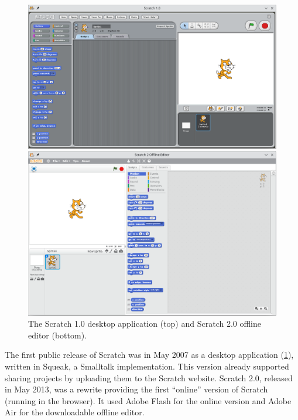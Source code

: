 \documentclass[../main]{subfiles}
\begin{document}
\begin{figure}
    \begin{wide}
        \includegraphics[width=\linewidth]{scratch-1}

        \vspace{0.5em}
        \includegraphics[width=\linewidth]{scratch-2}
    \end{wide}
    \caption{The Scratch 1.0 desktop application (top) and Scratch 2.0 offline editor (bottom).}
    \label{fig:scratch-1.0}
\end{figure}


The first public release of Scratch was in May 2007 as a desktop application (\cref{fig:scratch-1.0}), written in Squeak, a Smalltalk implementation.
This version already supported sharing projects by uploading them to the Scratch website.
Scratch 2.0, released in May 2013, was a rewrite providing the first ``online'' version of Scratch (running in the browser).
It used Adobe Flash for the online version and Adobe Air for the downloadable offline editor.
\end{document}

